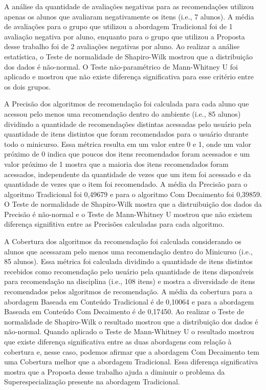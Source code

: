 A análise da quantidade de avaliações negativas para as recomendações utilizou apenas os alunos que avaliaram negativamente
os itens (i.e., 7 alunos). A média de avaliações para o grupo que utilizou a abordagem Tradicional foi de 1 avaliação negativa
por aluno, enquanto para o grupo que utilizou a Proposta desse trabalho foi de 2 avaliações negativas por aluno. Ao realizar
a análise estatística, o Teste de normalidade de Shapiro-Wilk mostrou que a distribuição dos dados é não-normal. O Teste
não-paramétrico de Mann-Whitney U foi aplicado e mostrou que não existe diferença significativa para esse critério entre
os dois grupos.

A Precisão dos algoritmos de recomendação foi calculada para cada aluno que acessou pelo menos uma recomendação dentro do
ambiente (i.e., 85 alunos) dividindo a quantidade de recomendações distintas acessadas pelo usuário pela quantidade de itens distintos
que foram recomendados para o usuário durante todo o minicurso. Essa métrica resulta em um valor entre 0 e 1, onde um valor
próximo de 0 indica que poucos dos itens recomendados foram acessados e um valor próximo de 1 mostra que a maioria dos itens
recomendados foram acessados, independente da quantidade de vezes que um item foi acessado e da quantidade de vezes que o
item foi recomendado. A média da Precisão para o algoritmo Tradicional foi 0,49679 e para o algoritmo Com Decaimento foi
0,39859. O Teste de normalidade de Shapiro-Wilk mostra que a distruibuição dos dados da Precisão é não-normal e o Teste
de Mann-Whitney U mostrou que não existem diferença signifitiva entre as Precisões calculadas para cada algoritmo.

A Cobertura dos algoritmos da recomendação foi calculada considerando os alunos que acessaram pelo menos uma recomendação
dentro do Minicurso (i.e., 85 alunos). Essa métrica foi calculada dividindo a quantidade de itens distintos recebidos
como recomendação pelo usuário pela quantidade de itens disponíveis para recomendação na disciplina (i.e., 108 itens) e mostra
a diversidade de itens recomendados pelos algoritmos de recomendação. A média da cobertura para a abordagem Baseada em Conteúdo
Tradicional é de 0,10064 e para a abordagem Baseada em Conteúdo Com Decaimento é de 0,17450. Ao realizar o Teste de
normalidade de Shapiro-Wilk o resultado mostrou que a distribuição dos dados é não-normal. Quando aplicado o Teste de Mann-Whitney
U o resultado mostrou que existe diferença significativa entre as duas abordagens com relação à cobertura e, nesse caso,
podemos afirmar que a abordagem Com Decaimento tem uma Cobertura melhor que a abordagem Tradicional. Essa diferença significativa
mostra que a Proposta desse trabalho ajuda a diminuir o problema da Superespecialização presente na abordagem Tradicional.

